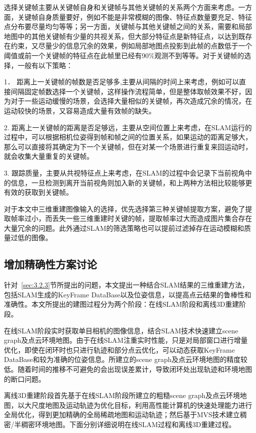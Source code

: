 选择关键帧主要从关键帧自身和关键帧与其他关键帧的关系两个方面来考虑。一方面，关键帧自身质量要好，例如不能是非常模糊的图像、特征点数量要充足、特征点分布要尽量均匀等等；另一方面，关键帧与其他关键帧之间的关系，需要和局部地图中的其他关键帧有少量的共视关系，但大部分特征点是新特征点，以达到既存在约束，又尽量少的信息冗余的效果，例如局部地图点投影到此帧的点数低于一个阈值或前一个关键帧的特征点在此帧里已经有90$\%$观测不到等等。对于关键帧的选择，一般有以下策略：

1． 距离上一关键帧的帧数是否足够多,主要从间隔的时间上来考虑，例如可以直接间隔固定帧数选择一个关键帧，这样操作流程简单，但是整体取帧效果不好，因为对于一些运动缓慢的场景，会选择大量相似的关键帧，再次造成冗余的情况，在运动较快的场景，又容易造成大量有效帧的缺失。

2. 距离上一关键帧的距离是否足够远，主要从空间位置上来考虑，在SLAM运行的过程中，可以根据相机位姿得到帧和帧之间的位置关系，如果运动的距离足够大，那么可以直接将其确定为下一个关键帧，但在对某一个场景进行重复来回运动时，就会收集大量重复的关键帧。

3. 跟踪质量，主要从共视特征点上来考虑，在SLAM的过程中会记录下当前视角中的信息，一旦检测到离开当前视角则加入新的关键帧，和上两种方法相比较能够更有效的获取到关键帧。

对于本文中三维重建图像输入的选择，优先选择第三种关键帧提取方案，避免了提取帧率过小，而丢失一些三维重建时关键的帧，提取帧率过大而造成图片集合存在大量冗余的问题。此外通过SLAM的筛选策略也可以提前过滤掉存在运动模糊和质量过低的图像。
\subsection{增加精确性方案讨论}
\label{sec:3.3.3}
针对~\ref{sec:3.2.3}节所提出的问题，本文提出一种结合SLAM结果的三维重建方法，包括SLAM生成的KeyFrame DataBase以及位姿信息，以提高点云结果的鲁棒性和准确性。本文所提出的建图过程分为两个阶段：在线SLAM阶段和离线3D重建阶段。

在线SLAM阶段实时获取单目相机的图像信息，结合SLAM技术快速建立scene graph及点云环境地图。由于在线SLAM注重实时性能，只是对局部窗口进行增量优化，即使在闭环时也只进行轨迹和部分点云优化，可以动态获取KeyFrame DataBase和较为准确的位姿信息。所建立的scene graph及点云环境地图的精度较低。随着时间的推移不可避免的会出现误差累计，导致闭环处出现轨迹和环境地图的断口问题。

离线3D重建阶段首先基于在线SLAM阶段所建立的粗糙scene graph及点云环境地图，以大尺度地图及运动轨迹为优化目标，利用高性能计算机的快速处理能力进行全局优化，得到更加精确的全局稀疏地图和运动轨迹；然后基于MVS技术建立稠密/半稠密环境地图。下面分别详细说明在线SLAM过程和离线3D重建过程。
